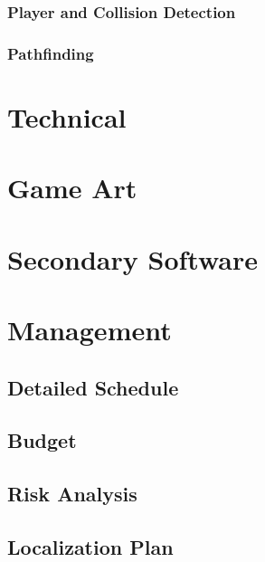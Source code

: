 \documentclass[12pt,titlepage]{article}
\begin{document}
\subsubsection{Player and Collision Detection}

\subsubsection{Pathfinding}

\newpage
\section{Technical}
%

\newpage
\section{Game Art}
%

\newpage
\section{Secondary Software}

\newpage
\section{Management}

\subsection{Detailed Schedule}

\subsection{Budget}

\subsection{Risk Analysis}

\subsection{Localization Plan}
\end{document}
